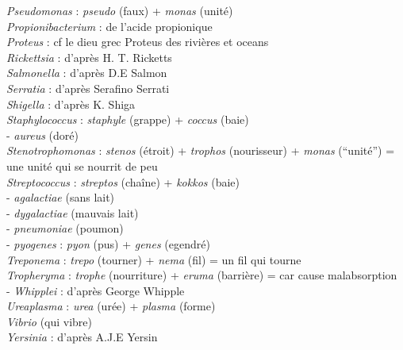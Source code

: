 \emph{Pseudomonas} : \emph{pseudo} (faux) + \emph{monas} (unité)\\
\emph{Propionibacterium} : de l'acide propionique\\
\emph{Proteus} : cf le dieu grec Proteus des rivières et oceans\\
\emph{Rickettsia} : d'après H. T. Ricketts\\
\emph{Salmonella} : d'après D.E Salmon\\
\emph{Serratia} : d'après Serafino Serrati\\
\emph{Shigella} : d'après K. Shiga\\
\emph{Staphylococcus} : \emph{staphyle} (grappe) + \emph{coccus}
(baie)\\
\hspace*{0.333em} - \emph{aureus} (doré)\\
\emph{Stenotrophomonas} : \emph{stenos} (étroit) + \emph{trophos}
(nourisseur) + \emph{monas} (``unité'') = une unité qui se nourrit de
peu\\
\emph{Streptococcus} : \emph{streptos} (chaîne) + \emph{kokkos} (baie)\\
\hspace*{0.333em} - \emph{agalactiae} (sans lait)\\
\hspace*{0.333em} - \emph{dygalactiae} (mauvais lait)\\
\hspace*{0.333em} - \emph{pneumoniae} (poumon)\\
\hspace*{0.333em} - \emph{pyogenes} : \emph{pyon} (pus) + \emph{genes}
(egendré)\\
\emph{Treponema} : \emph{trepo} (tourner) + \emph{nema} (fil) = un fil
qui tourne\\
\emph{Tropheryma} : \emph{trophe} (nourriture) + \emph{eruma} (barrière)
= car cause malabsorption\\
\hspace*{0.333em} - \emph{Whipplei} : d'après George Whipple\\
\emph{Ureaplasma} : \emph{urea} (urée) + \emph{plasma} (forme)\\
\emph{Vibrio} (qui vibre)\\
\emph{Yersinia} : d'après A.J.E Yersin


